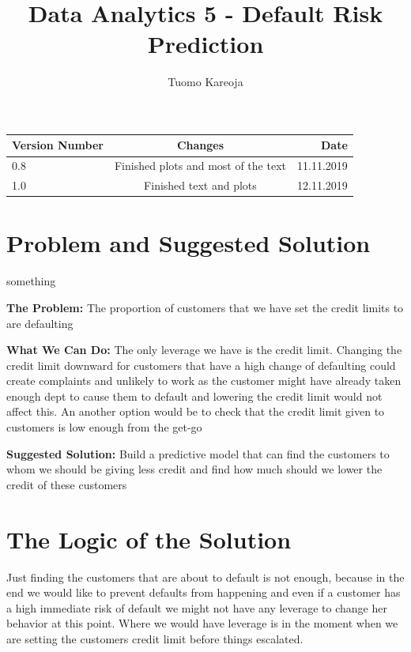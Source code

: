 \documentclass[12pt,a4paper,leqno]{report}
\title{Data Analytics 5 - Default Risk Prediction}
\author{Tuomo Kareoja}
\date{}
\theoremstyle{plain}
\theoremstyle{definition}
\theoremstyle{remark}
\begin{document}
\maketitle

\begin{table}[h!]
  \begin{center}
    \begin{tabular}{l|c|r}
      \textbf{Version Number} & \textbf{Changes} & \textbf{Date} \\
      \hline
      0.8 & Finished plots and most of the text & 11.11.2019\\
      1.0 & Finished text and plots & 12.11.2019\\
    \end{tabular}
  \end{center}
\end{table}

\newpage

\section{Problem and Suggested Solution}

\begin{labeling}{something}
\item [\textbf{The Problem:}] The proportion of customers that we have set the credit limits to are defaulting
\item [\textbf{What We Can Do:}] The only leverage we have is the credit limit. Changing the credit limit downward
    for customers that have a high change of defaulting could create complaints and unlikely to work as the customer
    might have already taken enough dept to cause them to default and lowering the credit limit would not affect this.
    An another option would be to check that the credit limit given to customers is low enough from the get-go
\item [\textbf{Suggested Solution:}] Build a predictive model that can find the customers to whom we should be giving less
    credit and find how much should we lower the credit of these customers
\end{labeling}

\section{The Logic of the Solution}

Just finding the customers that are about to default is not enough,
because in the end we would like to prevent defaults from happening
and even if a customer has a high immediate risk of default we might
not have any leverage to change her behavior at this point. Where
we would have leverage is in the moment when we are setting
the customers credit limit before things escalated.
\end{document}
